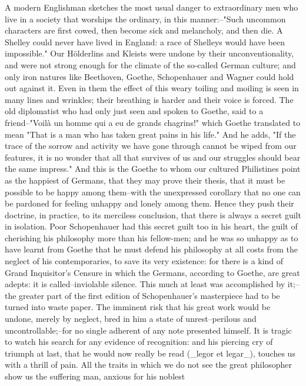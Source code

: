 A modern Englishman sketches the most usual danger to extraordinary
men who live in a society that worships the ordinary, in this
manner:--"Such uncommon characters are first cowed, then become sick
and melancholy, and then die. A Shelley could never have lived in
England: a race of Shelleys would have been impossible." Our
Hölderlins and Kleists were undone by their unconventionality, and
were not strong enough for the climate of the so-called German
culture; and only iron natures like Beethoven, Goethe, Schopenhauer
and Wagner could hold out against it. Even in them the effect of this
weary toiling and moiling is seen in many lines and wrinkles; their
breathing is harder and their voice is forced. The old diplomatist
who had only just seen and spoken to Goethe, said to a friend--"Voilà
un homme qui a eu de grands chagrins!" which Goethe translated to
mean "That is a man who has taken great pains in his life." And he
adds, "If the trace of the sorrow and activity we have gone through
cannot be wiped from our features, it is no wonder that all that
survives of us and our struggles should bear the same impress." And
this is the Goethe to whom our cultured Philistines point as the
happiest of Germans, that they may prove their thesis, that it must
be possible to be happy among them--with the unexpressed corollary
that no one can be pardoned for feeling unhappy and lonely among
them. Hence they push their doctrine, in practice, to its merciless
conclusion, that there is always a secret guilt in isolation. Poor
Schopenhauer had this secret guilt too in his heart, the guilt of
cherishing his philosophy more than his fellow-men; and he was so
unhappy as to have learnt from Goethe that he must defend his
philosophy at all costs from the neglect of his contemporaries, to
save its very existence: for there is a kind of Grand Inquisitor's
Censure in which the Germans, according to Goethe, are great adepts:
it is called--inviolable silence. This much at least was accomplished
by it;--the greater part of the first edition of Schopenhauer's
masterpiece had to be turned into waste paper. The imminent risk that
his great work would be undone, merely by neglect, bred in him a
state of unrest--perilous and uncontrollable;--for no single adherent
of any note presented himself. It is tragic to watch his search for
any evidence of recognition: and his piercing cry of triumph at last,
that he would now really be read (_legor et legar_), touches us with
a thrill of pain. All the traits in which we do not see the great
philosopher show us the suffering man, anxious for his noblest
